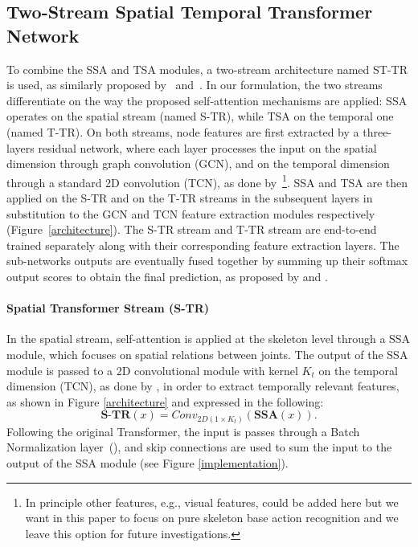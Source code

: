 \documentclass[times,twocolumn,final,authoryear]{elsarticle}
\begin{document}
\subsection{Two-Stream Spatial Temporal Transformer Network}\label{2s}

To combine the SSA and TSA modules, a two-stream architecture named ST-TR is used, as similarly proposed by~\cite{Shi2018TwoStreamAG} and~\cite{dirgraph}. In our formulation, the two streams differentiate on the way the proposed self-attention mechanisms are applied: SSA operates on the spatial stream (named S-TR), while TSA on the temporal one (named T-TR). On both streams, node features are first extracted by a three-layers residual network, where each layer processes the input on the spatial dimension through graph convolution (GCN), and on the temporal dimension through a standard 2D convolution (TCN), as done by~\cite{yan2018spatial}\footnote{In principle other features, e.g., visual features, could be added here but we want in this paper to focus on pure skeleton base action recognition and we leave this option for future investigations.}. 
SSA and TSA are then applied on the S-TR and on the T-TR streams in the subsequent layers in substitution to the GCN and TCN feature extraction modules respectively (Figure~\ref{architecture}). The S-TR stream and T-TR stream are end-to-end trained separately along with their corresponding feature extraction layers. The sub-networks outputs are eventually fused together by summing up their softmax output scores to obtain the final prediction, as proposed by \cite{Shi2018TwoStreamAG} and \cite{dirgraph}. 



\paragraph*{\textbf{Spatial Transformer Stream (S-TR)}} In the spatial stream, self-attention is applied at the skeleton level through a SSA module, which focuses on spatial relations between joints. The output of the SSA module is passed to a 2D convolutional module with kernel $K_t$ on the temporal dimension (TCN), as done by \cite{yan2018spatial}, in order to extract temporally relevant features, as shown in Figure \ref{architecture} and expressed in the following: 
\begin{equation}
    \textbf{S-TR}(x)= Conv_{2D(1\times{K_t})}(\textbf{{SSA}}(x)) .
\end{equation}
Following the original Transformer, the input is passes through a Batch Normalization layer~(\cite{ioffe2015batch, bn_tr}), and skip connections are used to sum the input to the output of the SSA module (see Figure \ref{implementation}).
\end{document}
